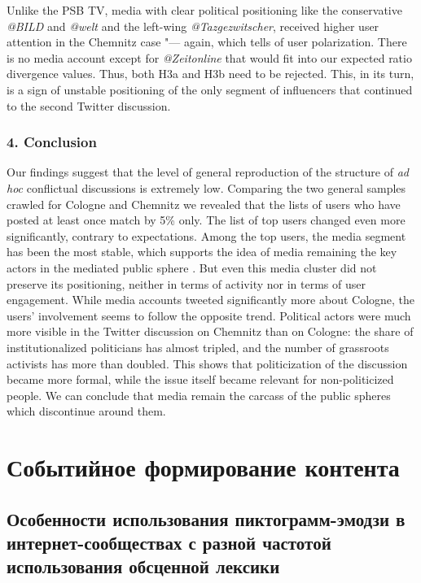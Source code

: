 Unlike the PSB TV, media with clear political positioning like the conservative \textit{@BILD} and \textit{@welt} and the left-wing \textit{@Tazgezwitscher}, received higher user attention in the Chemnitz case "--- again, which tells of user polarization. There is no media account except for \textit{@Zeitonline} that would fit into our expected ratio divergence values. Thus, both H3a and H3b need to be rejected. This, in its turn, is a sign of unstable positioning of the only segment of influencers that continued to the second Twitter discussion.

\subsubsection{4. Conclusion}

Our findings suggest that the level of general reproduction of the structure of \textit{ad hoc} conflictual discussions is extremely low. Comparing the two general samples crawled for Cologne and Chemnitz we revealed that the lists of users who have posted at least once match by 5\% only. The list of top users changed even more significantly, contrary to expectations. Among the top users, the media segment has been the most stable, which supports the idea of media remaining the key actors in the mediated public sphere \cite{Calhoun}. But even this media cluster did not preserve its positioning, neither in terms of activity nor in terms of user engagement. While media accounts tweeted significantly more about Cologne, the users’ involvement seems to follow the opposite trend. Political actors were much more visible in the Twitter discussion on Chemnitz than on Cologne: the share of institutionalized politicians has almost tripled, and the number of grassroots activists has more than doubled. This shows that politicization of the discussion became more formal, while the issue itself became relevant for non-politicized people. We can conclude that media remain the carcass of the public spheres which discontinue around them.

\section{Событийное формирование контента}\label{sec:ch3/sec2}

\subsection{Особенности использования пиктограмм-эмодзи в интернет-сообществах с разной частотой использования обсценной лексики}\label{subsec:ch3/sec2/sub1}

